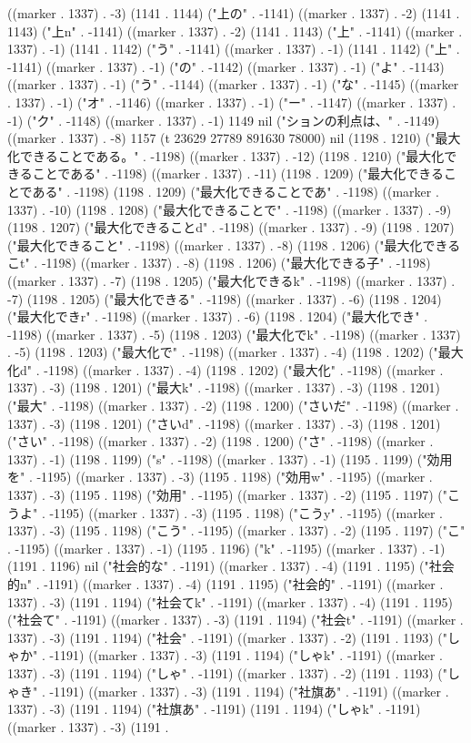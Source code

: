 ((marker . 1337) . -3) (1141 . 1144) ("上の" . -1141) ((marker . 1337) . -2) (1141 . 1143) ("上n" . -1141) ((marker . 1337) . -2) (1141 . 1143) ("上" . -1141) ((marker . 1337) . -1) (1141 . 1142) ("う" . -1141) ((marker . 1337) . -1) (1141 . 1142) ("上" . -1141) ((marker . 1337) . -1) ("の" . -1142) ((marker . 1337) . -1) ("よ" . -1143) ((marker . 1337) . -1) ("う" . -1144) ((marker . 1337) . -1) ("な" . -1145) ((marker . 1337) . -1) ("オ" . -1146) ((marker . 1337) . -1) ("ー" . -1147) ((marker . 1337) . -1) ("ク" . -1148) ((marker . 1337) . -1) 1149 nil ("ションの利点は、" . -1149) ((marker . 1337) . -8) 1157 (t 23629 27789 891630 78000) nil (1198 . 1210) ("最大化できることである。" . -1198) ((marker . 1337) . -12) (1198 . 1210) ("最大化できることである" . -1198) ((marker . 1337) . -11) (1198 . 1209) ("最大化できることである" . -1198) (1198 . 1209) ("最大化できることであ" . -1198) ((marker . 1337) . -10) (1198 . 1208) ("最大化できることで" . -1198) ((marker . 1337) . -9) (1198 . 1207) ("最大化できることd" . -1198) ((marker . 1337) . -9) (1198 . 1207) ("最大化できること" . -1198) ((marker . 1337) . -8) (1198 . 1206) ("最大化できるこt" . -1198) ((marker . 1337) . -8) (1198 . 1206) ("最大化できる子" . -1198) ((marker . 1337) . -7) (1198 . 1205) ("最大化できるk" . -1198) ((marker . 1337) . -7) (1198 . 1205) ("最大化できる" . -1198) ((marker . 1337) . -6) (1198 . 1204) ("最大化できr" . -1198) ((marker . 1337) . -6) (1198 . 1204) ("最大化でき" . -1198) ((marker . 1337) . -5) (1198 . 1203) ("最大化でk" . -1198) ((marker . 1337) . -5) (1198 . 1203) ("最大化で" . -1198) ((marker . 1337) . -4) (1198 . 1202) ("最大化d" . -1198) ((marker . 1337) . -4) (1198 . 1202) ("最大化" . -1198) ((marker . 1337) . -3) (1198 . 1201) ("最大k" . -1198) ((marker . 1337) . -3) (1198 . 1201) ("最大" . -1198) ((marker . 1337) . -2) (1198 . 1200) ("さいだ" . -1198) ((marker . 1337) . -3) (1198 . 1201) ("さいd" . -1198) ((marker . 1337) . -3) (1198 . 1201) ("さい" . -1198) ((marker . 1337) . -2) (1198 . 1200) ("さ" . -1198) ((marker . 1337) . -1) (1198 . 1199) ("s" . -1198) ((marker . 1337) . -1) (1195 . 1199) ("効用を" . -1195) ((marker . 1337) . -3) (1195 . 1198) ("効用w" . -1195) ((marker . 1337) . -3) (1195 . 1198) ("効用" . -1195) ((marker . 1337) . -2) (1195 . 1197) ("こうよ" . -1195) ((marker . 1337) . -3) (1195 . 1198) ("こうy" . -1195) ((marker . 1337) . -3) (1195 . 1198) ("こう" . -1195) ((marker . 1337) . -2) (1195 . 1197) ("こ" . -1195) ((marker . 1337) . -1) (1195 . 1196) ("k" . -1195) ((marker . 1337) . -1) (1191 . 1196) nil ("社会的な" . -1191) ((marker . 1337) . -4) (1191 . 1195) ("社会的n" . -1191) ((marker . 1337) . -4) (1191 . 1195) ("社会的" . -1191) ((marker . 1337) . -3) (1191 . 1194) ("社会てk" . -1191) ((marker . 1337) . -4) (1191 . 1195) ("社会て" . -1191) ((marker . 1337) . -3) (1191 . 1194) ("社会t" . -1191) ((marker . 1337) . -3) (1191 . 1194) ("社会" . -1191) ((marker . 1337) . -2) (1191 . 1193) ("しゃか" . -1191) ((marker . 1337) . -3) (1191 . 1194) ("しゃk" . -1191) ((marker . 1337) . -3) (1191 . 1194) ("しゃ" . -1191) ((marker . 1337) . -2) (1191 . 1193) ("しゃき" . -1191) ((marker . 1337) . -3) (1191 . 1194) ("社旗あ" . -1191) ((marker . 1337) . -3) (1191 . 1194) ("社旗あ" . -1191) (1191 . 1194) ("しゃk" . -1191) ((marker . 1337) . -3) (1191 . 